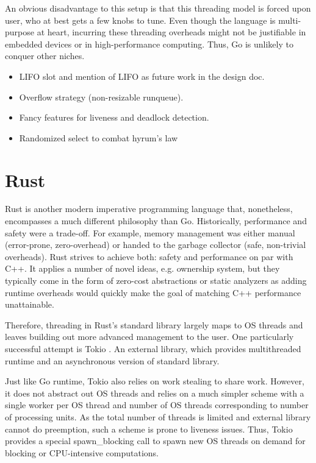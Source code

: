 \documentclass[12pt,a4paper,twoside]{report}
\begin{document}
An obvious disadvantage to this setup is that this threading model is forced upon user, who at best gets a few knobs to tune. Even though the language is multi-purpose at heart, incurring these threading overheads might not be justifiable in embedded devices or in high-performance computing. Thus, Go is unlikely to conquer other niches. 



\begin{itemize}
    \item LIFO slot and mention of LIFO as future work in the design doc.
    \item Overflow strategy (non-resizable runqueue).
    \item Fancy features for liveness and deadlock detection.
    \item Randomized select to combat hyrum's law
\end{itemize}


\section{Rust}
\label{section:rel-work-rust}
Rust is another modern imperative programming language that, nonetheless, encompasses a much different philosophy than Go. Historically, performance and safety were a trade-off. For example, memory management was either manual (error-prone, zero-overhead) or handed to the garbage collector (safe, non-trivial overheads). Rust strives to achieve both: safety and performance on par with C++. It applies a number of novel ideas, e.g. ownership system, but they typically come in the form of zero-cost abstractions or static analyzers as adding runtime overheads would quickly make the goal of matching C++ performance unattainable. 

Therefore, threading in Rust's standard library largely maps to OS threads and leaves building out more advanced management to the user. One particularly successful attempt is Tokio \cite{TokioAna8:online}. An external library, which provides multithreaded runtime and an asynchronous version of standard library.

Just like Go runtime, Tokio also relies on work stealing to share work. However, it does not abstract out OS threads and relies on a much simpler scheme with a single worker per OS thread and number of OS threads corresponding to number of processing units. As the total number of threads is limited and external library cannot do preemption, such a scheme is prone to liveness issues. Thus, Tokio provides a special spawn\_blocking call to spawn new OS threads on demand for blocking or CPU-intensive computations. 
\end{document}
